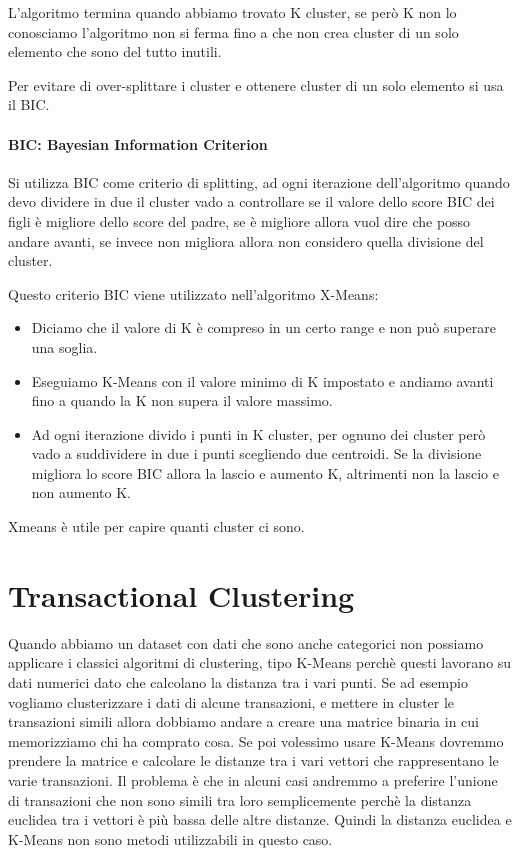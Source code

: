 \documentclass[14pt]{extreport}
\begin{document}
L'algoritmo termina quando abbiamo trovato K cluster, se però K non lo conosciamo l'algoritmo non si ferma fino a che non crea cluster di un solo elemento che sono del tutto inutili.

Per evitare di over-splittare i cluster e ottenere cluster di un solo elemento si usa il BIC.

\subsubsection{BIC: Bayesian Information Criterion}

Si utilizza BIC come criterio di splitting, ad ogni iterazione dell'algoritmo quando devo dividere in due il cluster vado a controllare se il valore dello score BIC dei figli è migliore dello score del padre, se è migliore allora vuol dire che posso andare avanti, se invece non migliora allora non considero quella divisione del cluster.

Questo criterio BIC viene utilizzato nell'algoritmo X-Means:
\begin{itemize}
    \item Diciamo che il valore di K è compreso in un certo range e non può superare una soglia.
    \item Eseguiamo K-Means con il valore minimo di K impostato e andiamo avanti fino a quando la K non supera il valore massimo. 
    \item Ad ogni iterazione divido i punti in K cluster, per ognuno dei cluster però vado a suddividere in due i punti scegliendo due centroidi. Se la divisione migliora lo score BIC allora la lascio e aumento K, altrimenti non la lascio e non aumento K.
\end{itemize}

Xmeans è utile per capire quanti cluster ci sono.


\chapter{Transactional Clustering}

Quando abbiamo un dataset con dati che sono anche categorici non possiamo applicare i classici algoritmi di clustering, tipo K-Means perchè questi lavorano su dati numerici dato che calcolano la distanza tra i vari punti.
Se ad esempio vogliamo clusterizzare i dati di alcune transazioni, e mettere in cluster le transazioni simili allora dobbiamo andare a creare una matrice binaria in cui memorizziamo chi ha comprato cosa.
Se poi volessimo usare K-Means dovremmo prendere la matrice e calcolare le distanze tra i vari vettori che rappresentano le varie transazioni. Il problema è che in alcuni casi andremmo a preferire l'unione di transazioni che non sono simili tra loro semplicemente perchè la distanza euclidea tra i vettori è più bassa delle altre distanze.
Quindi la distanza euclidea e K-Means non sono metodi utilizzabili in questo caso.
\end{document}
